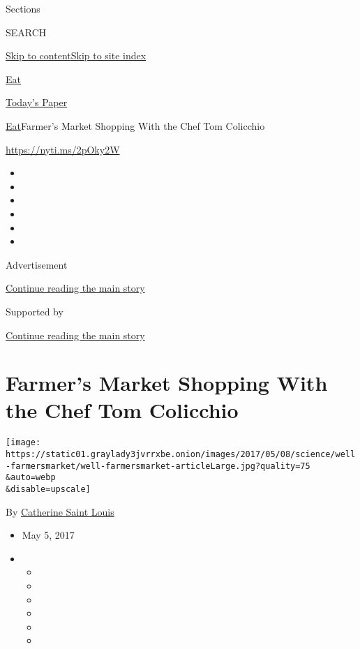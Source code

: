 Sections

SEARCH

\protect\hyperlink{site-content}{Skip to
content}\protect\hyperlink{site-index}{Skip to site index}

\href{https://www.nytimes3xbfgragh.onion/section/well/eat}{Eat}

\href{https://myaccount.nytimes3xbfgragh.onion/auth/login?response_type=cookie\&client_id=vi}{}

\href{https://www.nytimes3xbfgragh.onion/section/todayspaper}{Today's
Paper}

\href{/section/well/eat}{Eat}\textbar{}Farmer's Market Shopping With the
Chef Tom Colicchio

\url{https://nyti.ms/2pOky2W}

\begin{itemize}
\item
\item
\item
\item
\item
\item
\end{itemize}

Advertisement

\protect\hyperlink{after-top}{Continue reading the main story}

Supported by

\protect\hyperlink{after-sponsor}{Continue reading the main story}

\hypertarget{farmers-market-shopping-with-the-chef-tom-colicchio}{%
\section{Farmer's Market Shopping With the Chef Tom
Colicchio}\label{farmers-market-shopping-with-the-chef-tom-colicchio}}

\texttt{[image: https://static01.graylady3jvrrxbe.onion/images/2017/05/08/science/well-farmersmarket/well-farmersmarket-articleLarge.jpg?quality=75\\\&auto=webp\\\&disable=upscale]}

By
\href{http://www.nytimes3xbfgragh.onion/by/catherine-saint-louis}{Catherine
Saint Louis}

\begin{itemize}
\item
  May 5, 2017
\item
  \begin{itemize}
  \item
  \item
  \item
  \item
  \item
  \item
  \end{itemize}
\end{itemize}

